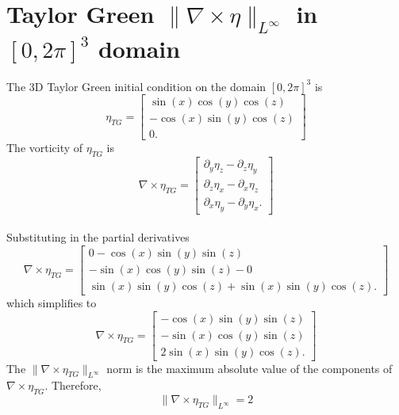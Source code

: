 \chapter{Taylor Green $\|\nabla\times\eta\|_{L^\infty}$ in $[0,2\pi]^3$ domain}
\label{app:tg:vorticity:2pi}

The 3D Taylor Green initial condition on the domain $[0,2\pi]^3$ is
$$\eta_{TG} = \begin{bmatrix}
           \sin(x)\cos(y)\cos(z) \\
           -\cos(x)\sin(y)\cos(z) \\
           0.
         \end{bmatrix}$$
The vorticity of $\eta_{TG}$ is
$$\nabla \times \eta_{TG} = \begin{bmatrix}
           \partial_y\eta_z - \partial_z\eta_y \\
           \partial_z\eta_x - \partial_x\eta_z \\
           \partial_x\eta_y - \partial_y\eta_x.
         \end{bmatrix}$$
\\
Substituting in the partial derivatives
\\
$$\nabla \times \eta_{TG} = \begin{bmatrix}
           0 - \cos(x)\sin(y)\sin(z) \\
           -\sin(x)\cos(y)\sin(z) - 0\\
           \sin(x)\sin(y)\cos(z) + \sin(x)\sin(y)\cos(z).
         \end{bmatrix}$$
which simplifies to 
$$\nabla \times \eta_{TG} = \begin{bmatrix}
           -\cos(x)\sin(y)\sin(z) \\
           -\sin(x)\cos(y)\sin(z)\\
           2\sin(x)\sin(y)\cos(z).
         \end{bmatrix}$$
The $\|\nabla \times \eta_{TG}\|_{L^{\infty}}$ norm is the maximum absolute value of the components of $\nabla \times \eta_{TG}$. Therefore,
$$\|\nabla \times \eta_{TG}\|_{L^{\infty}} = 2$$